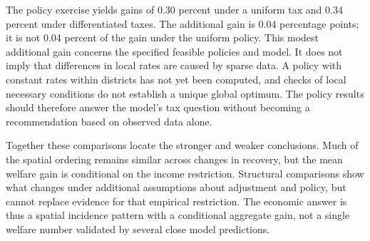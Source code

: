 The policy exercise yields gains of 0.30 percent under a uniform tax and 0.34
percent under differentiated taxes. The additional gain is 0.04 percentage points;
it is not 0.04 percent of the gain under the uniform policy. This modest additional gain concerns
the specified feasible policies and model. It does not imply that differences in
local rates are caused by sparse data. A policy with constant rates within districts
has not yet been computed, and checks of local necessary conditions do not establish
a unique global optimum. The policy results should therefore answer the model's
tax question without becoming a recommendation based on observed data alone.

Together these comparisons locate the stronger and weaker conclusions. Much of
the spatial ordering remains similar across changes in recovery, but the mean welfare gain is
conditional on the income restriction. Structural comparisons show what changes
under additional assumptions about adjustment and policy, but cannot replace
evidence for that empirical restriction. The economic answer is thus a spatial
incidence pattern with a conditional aggregate gain, not a single welfare number
validated by several close model predictions.
